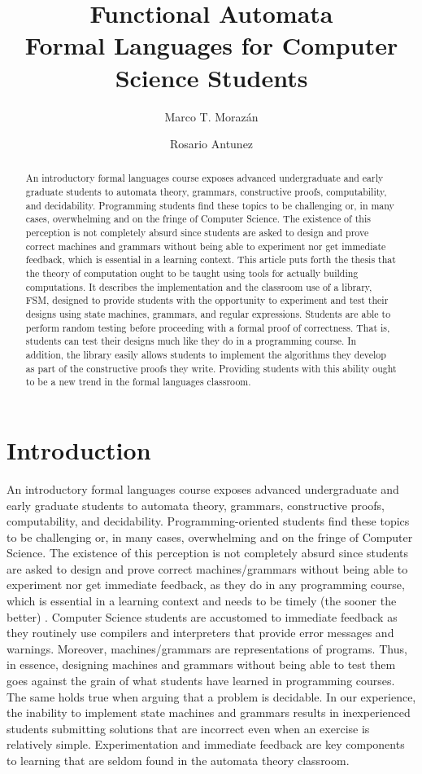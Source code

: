 \documentclass{eptcs}
\title{Functional Automata \\ \large{Formal Languages for Computer Science Students}}
\author{Marco T. Moraz\'an
\institute{Seton Hall University}
\email{morazanm@shu.edu}
\and
Rosario Antunez
\institute{City College of New York}
\email{mrantunez@gmail.com}
}
\begin{document}
\maketitle

\begin{abstract}
An introductory formal languages course exposes advanced undergraduate and early graduate students to automata theory, grammars, constructive proofs, computability, and decidability. Programming students find these topics to be challenging or, in many cases, overwhelming and on the fringe of Computer Science. The existence of this perception is not completely absurd since students are asked to design and prove correct machines and grammars without being able to experiment nor get immediate feedback, which is essential in a learning context. This article puts forth the thesis that the theory of computation ought to be taught using tools for actually building computations. It describes the implementation and the classroom use of a library, \textsf{FSM}, designed to provide students with the opportunity to experiment and test their designs using state machines, grammars, and regular expressions. Students are able to perform random testing before proceeding with a formal proof of correctness. That is, students can test their designs much like they do in a programming course. In addition, the library easily allows students to implement the algorithms they develop as part of the constructive proofs they write. Providing students with this ability ought to be a new trend in the formal languages classroom.
\end{abstract}

\section{Introduction}
An introductory formal languages course exposes advanced undergraduate and early graduate students to automata theory, grammars, constructive proofs, computability, and decidability. Programming-oriented students find these topics to be challenging or, in many cases, overwhelming and on the fringe of Computer Science. The existence of this perception is not completely absurd since students are asked to design and prove correct machines/grammars without being able to experiment nor get immediate feedback, as they do in any programming course, which is essential in a learning context and needs to be timely (the sooner the better) \cite{Race}. Computer Science students are accustomed to immediate feedback as they routinely use compilers and interpreters that provide error messages and warnings. Moreover, machines/grammars are representations of programs. Thus, in essence, designing machines and grammars without being able to test them goes against the grain of what students have learned in programming courses. The same holds true when arguing that a problem is decidable. In our experience, the inability to implement state machines and grammars results in inexperienced students submitting solutions that are incorrect even when an exercise is relatively simple. Experimentation and immediate feedback are key components to learning that are seldom found in the automata theory classroom.
\end{document}
